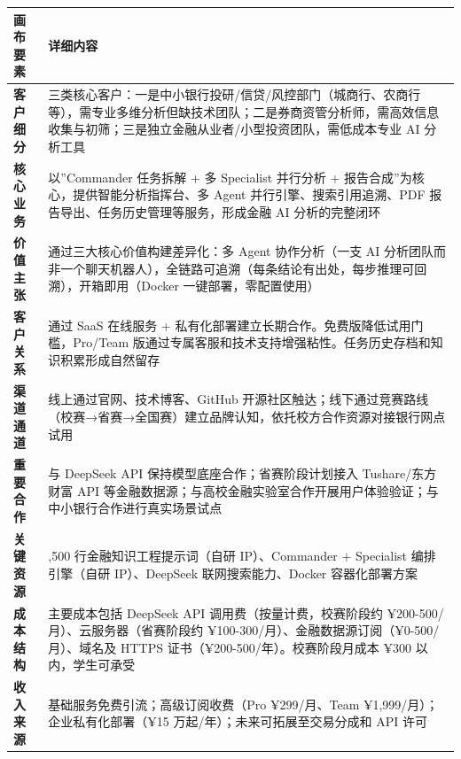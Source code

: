 \documentclass[
]{ctexart}
\begin{document}
\begin{longtable}[]{@{}
  >{\raggedright\arraybackslash}p{}
  >{\raggedright\arraybackslash}p{}@{}}
\toprule\noalign{}
\begin{minipage}[b]{\linewidth}\raggedright
画布要素
\end{minipage} & \begin{minipage}[b]{\linewidth}\raggedright
详细内容
\end{minipage} \\
\midrule\noalign{}
\endhead
\bottomrule\noalign{}
\endlastfoot
\textbf{客户细分} &
三类核心客户：一是中小银行投研/信贷/风控部门（城商行、农商行等），需专业多维分析但缺技术团队；二是券商资管分析师，需高效信息收集与初筛；三是独立金融从业者/小型投资团队，需低成本专业
AI 分析工具 \\
\textbf{核心业务} & 以''Commander 任务拆解 + 多 Specialist 并行分析 +
报告合成''为核心，提供智能分析指挥台、多 Agent
并行引擎、搜索引用追溯、PDF 报告导出、任务历史管理等服务，形成金融 AI
分析的完整闭环 \\
\textbf{价值主张} & 通过三大核心价值构建差异化：多 Agent 协作分析（一支
AI
分析团队而非一个聊天机器人），全链路可追溯（每条结论有出处，每步推理可回溯），开箱即用（Docker
一键部署，零配置使用） \\
\textbf{客户关系} & 通过 SaaS 在线服务 +
私有化部署建立长期合作。免费版降低试用门槛，Pro/Team
版通过专属客服和技术支持增强粘性。任务历史存档和知识积累形成自然留存 \\
\textbf{渠道通道} & 线上通过官网、技术博客、GitHub
开源社区触达；线下通过竞赛路线（校赛→省赛→全国赛）建立品牌认知，依托校方合作资源对接银行网点试用 \\
\textbf{重要合作} & 与 DeepSeek API 保持模型底座合作；省赛阶段计划接入
Tushare/东方财富 API
等金融数据源；与高校金融实验室合作开展用户体验验证；与中小银行合作进行真实场景试点 \\
\textbf{关键资源} & 3,500 行金融知识工程提示词（自研 IP）、Commander +
Specialist 编排引擎（自研 IP）、DeepSeek 联网搜索能力、Docker
容器化部署方案 \\
\textbf{成本结构} & 主要成本包括 DeepSeek API
调用费（按量计费，校赛阶段约 ¥200-500/月）、云服务器（省赛阶段约
¥100-300/月）、金融数据源订阅（¥0-500/月）、域名及 HTTPS
证书（¥200-500/年）。校赛阶段月成本 ¥300 以内，学生可承受 \\
\textbf{收入来源} & 基础服务免费引流；高级订阅收费（Pro ¥299/月、Team
¥1,999/月）；企业私有化部署（¥15 万起/年）；未来可拓展至交易分成和 API
许可 \\
\end{longtable}
\end{document}

